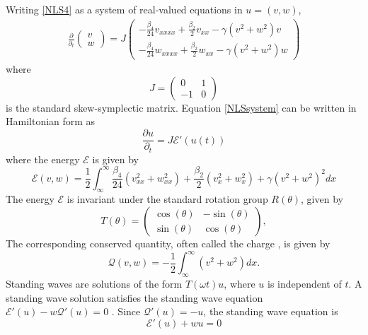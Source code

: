 \documentclass[12pt]{article}
\def\calE{{\mathcal E}}
\def\calQ{{\mathcal Q}}
\begin{document}
Writing \cref{NLS4} as a system of real-valued equations in $u = (v, w)$,
\begin{align}\label{NLSsystem}
\frac{\partial}{\partial_t}
\begin{pmatrix}v \\ w \end{pmatrix}
= J \begin{pmatrix}
-\frac{\beta_4}{24} v_{xxxx} + \frac{\beta_2}{2} v_{xx} - \gamma (v^2 + w^2)v \\
-\frac{\beta_4}{24} w_{xxxx} + \frac{\beta_2}{2} w_{xx} - \gamma (v^2 + w^2)w 
\end{pmatrix}
\end{align}
where 
\[
J = \begin{pmatrix}0 & 1 \\ -1 & 0 \end{pmatrix}
\]
is the standard skew-symplectic matrix. Equation \cref{NLSsystem} can be written in Hamiltonian form as 
\begin{equation}\label{NLSHam}
\frac{\partial u}{\partial_t} = J \calE'(u(t))
\end{equation}
where the energy $\calE$ is given by
\begin{equation}\label{defH}
\calE(v, w) = \frac{1}{2} \int_{\infty}^\infty \frac{\beta_4}{24}\left( v_{xx}^2 + w_{xx}^2 \right) + \frac{\beta_2}{2}\left( v_{x}^2 + w_{x}^2 \right) + \gamma \left(v^2 + w^2 \right)^2 dx
\end{equation}
The energy $\mathcal{E}$ is invariant under the standard rotation group $R(\theta)$, given by
\begin{equation}\label{Rtheta}
T(\theta) = \begin{pmatrix}
\cos(\theta) & -\sin(\theta) \\
\sin(\theta)& \cos(\theta)
\end{pmatrix},
\end{equation}
The corresponding conserved quantity, often called the charge \cite[Section 6.C]{Grillakis1987}, is given by
\begin{equation}\label{defQ}
\mathcal{Q}(v, w) = -\frac{1}{2} \int_{\infty}^\infty \left( v^2 + w^2\right) dx.
\end{equation}
Standing waves are solutions of the form $T(\omega t) u$, where $u$ is independent of $t$. A standing wave solution satisfies the standing wave equation $\calE'(u) - w \calQ'(u) = 0$ \cite[2.15]{Grillakis1987}. Since $\calQ'(u) = -u$, the standing wave equation is
\begin{equation}\label{standingwaveeq}
\calE'(u) + w u = 0
\end{equation}
\end{document}
